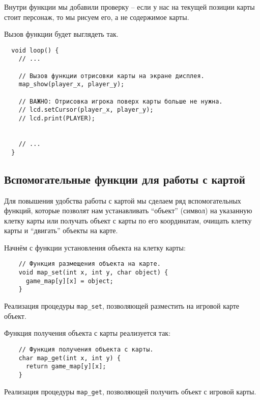\documentclass[../sparc.tex]{subfiles}
\begin{document}
Внутри функции мы добавили проверку -- если у нас на текущей позиции карты стоит
персонаж, то мы рисуем его, а не содержимое карты.

Вызов функции будет выглядеть так.

\begin{verbatim}
  void loop() {
    // ...

    // Вызов функции отрисовки карты на экране дисплея.
    map_show(player_x, player_y);

    // ВАЖНО: Отрисовка игрока поверх карты больше не нужна.
    // lcd.setCursor(player_x, player_y);
    // lcd.print(PLAYER);


    // ...
  }
\end{verbatim}

\subsection{Вспомогательные функции для работы с картой}
\label{game-dev-game-map:extra-procedures}

Для повышения удобства работы с картой мы сделаем ряд вспомогательных функций,
которые позволят нам устанавливать ``объект'' (символ) на указанную клетку карты
или получать объект с карты по его координатам, очищать клетку карты и
``двигать'' объекты на карте.

Начнём с функции установления объекта на клетку карты:

\begin{listing}[H]
  \begin{verbatim}
    // Функция размещения объекта на карте.
    void map_set(int x, int y, char object) {
      game_map[y][x] = object;
    }
  \end{verbatim}
  \caption{Реализация процедуры \texttt{map\_set}, позволяющей разместить на
    игровой карте объект.}
  \label{listing:game-dev-map-set-procedure}
\end{listing}

Функция получения объекта с карты реализуется так:

\begin{listing}[H]
  \begin{verbatim}
    // Функция получения объекта с карты.
    char map_get(int x, int y) {
      return game_map[y][x];
    }
  \end{verbatim}
  \caption{Реализация процедуры \texttt{map\_get}, позволяющей получить объект с
    игровой карты.}
  \label{listing:game-dev-map-get--procedure}
\end{listing}
\end{document}
